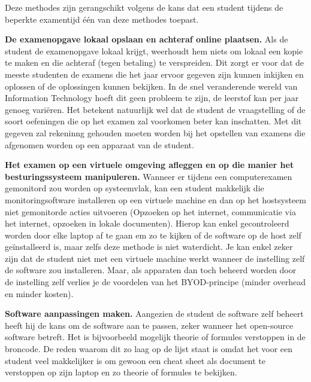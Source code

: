 Deze methodes zijn gerangschikt volgens de kans dat een student tijdens de beperkte examentijd \'{e}\'{e}n van deze methodes toepast.  

\textbf{De examenopgave lokaal opslaan en achteraf online plaatsen.} Als de student de examenopgave lokaal krijgt, weerhoudt hem niets om lokaal een kopie te maken en die achteraf (tegen betaling) te verspreiden. Dit zorgt er voor dat de meeste studenten de examens die het jaar ervoor gegeven zijn kunnen inkijken en oplossen of de oplossingen kunnen bekijken. In de snel veranderende wereld van Information Technology hoeft dit geen probleem te zijn, de leerstof kan per jaar genoeg vari\"{e}ren. Het betekent natuurlijk wel dat de student de vraagstelling of de soort oefeningen die op het examen zal voorkomen beter kan inschatten. Met dit gegeven zal rekeninng gehouden moeten worden bij het opstellen van examens die afgenomen worden op een apparaat van de student. 

\textbf{Het examen op een virtuele omgeving afleggen en op die manier het besturingssysteem manipuleren.} Wanneer er tijdens een computerexamen gemonitord zou worden op systeemvlak, kan een student makkelijk die monitoringsoftware installeren op een virtuele machine en dan op het hostsysteem niet gemonitorde acties uitvoeren (Opzoeken op het internet, communicatie via het internet, opzoeken in lokale documenten). Hierop kan enkel gecontroleerd worden door elke laptop af te gaan em zo te kijken of de software op de host zelf ge\"{i}nstalleerd is, maar zelfs deze methode is niet waterdicht. Je kan enkel zeker zijn dat de student niet met een virtuele machine werkt wanneer de instelling zelf de software zou installeren. Maar, als apparaten dan toch beheerd worden door de instelling zelf verlies je de voordelen van het BYOD-principe (minder overhead en minder kosten).

\textbf{Software aanpassingen maken.} Aangezien de student de software zelf beheert heeft hij de kans om de software aan te passen, zeker wanneer het open-source software betreft. Het is bijvoorbeeld mogelijk theorie of formules verstoppen in de broncode. De reden waarom dit zo laag op de lijst staat is omdat het voor een student veel makkelijker is om gewoon een cheat sheet als document te verstoppen op zijn laptop en zo theorie of formules te bekijken. 


